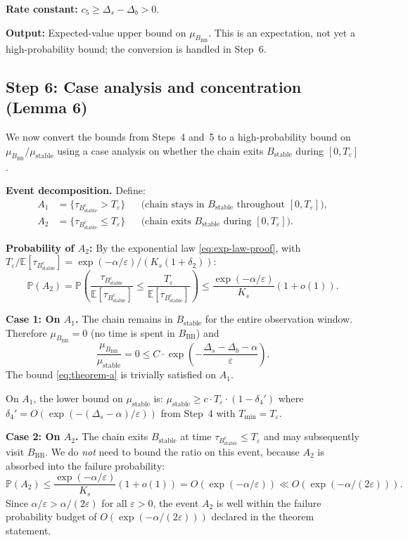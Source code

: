 \documentclass[11pt]{article}
\newcommand{\eps}{\varepsilon}
\newcommand{\Ds}{\Delta_s}
\newcommand{\Db}{\Delta_b}
\newcommand{\Bstable}{B_{\mathrm{stable}}}
\newcommand{\BBB}{B_{\mathrm{BB}}}
\newcommand{\Teps}{T_\eps}
\begin{document}
\textbf{Rate constant:} $c_5 \geq \Ds - \Db > 0$.

\textbf{Output:} Expected-value upper bound on $\mu_\BBB$.
This is an expectation, not yet a high-probability bound;
the conversion is handled in Step~6.

\subsection*{Step 6: Case analysis and concentration (Lemma 6)}
\label{step:case-analysis}

We now convert the bounds from Steps~4 and~5 to a high-probability
bound on $\mu_\BBB / \mu_{\mathrm{stable}}$ using a case analysis
on whether the chain exits $\Bstable$ during $[0, \Teps]$.

\medskip
\textbf{Event decomposition.} Define:
\begin{align*}
  A_1 &= \{\tau_{\Bstable^c} > \Teps\}
    && \text{(chain stays in $\Bstable$ throughout $[0, \Teps]$)}, \\
  A_2 &= \{\tau_{\Bstable^c} \leq \Teps\}
    && \text{(chain exits $\Bstable$ during $[0, \Teps]$)}.
\end{align*}

\textbf{Probability of $A_2$:}
By the exponential law \eqref{eq:exp-law-proof}, with
$\Teps / \mathbb{E}[\tau_{\Bstable^c}]
= \exp(-\alpha/\eps) / (K_s(1+\delta_2))$:
\begin{equation}\label{eq:P-A2}
  \mathbb{P}(A_2)
  = \mathbb{P}\!\left(
    \frac{\tau_{\Bstable^c}}{\mathbb{E}[\tau_{\Bstable^c}]}
    \leq \frac{\Teps}{\mathbb{E}[\tau_{\Bstable^c}]}
  \right)
  \leq \frac{\exp(-\alpha/\eps)}{K_s}(1 + o(1)).
\end{equation}

\textbf{Case 1: On $A_1$.}
The chain remains in $\Bstable$ for the entire observation window.
Therefore $\mu_\BBB = 0$ (no time is spent in $\BBB$) and
\[
  \frac{\mu_\BBB}{\mu_{\mathrm{stable}}} = 0
  \leq C \cdot \exp\!\left(-\frac{\Ds - \Db - \alpha}{\eps}\right).
\]
The bound \eqref{eq:theorem-a} is trivially satisfied on $A_1$.

On $A_1$, the lower bound on $\mu_{\mathrm{stable}}$ is:
$\mu_{\mathrm{stable}} \geq c \cdot \Teps \cdot (1 - \delta_4')$
where $\delta_4' = O(\exp(-(\Ds - \alpha)/\eps))$
from Step~4 with $T_{\min} = \Teps$.

\textbf{Case 2: On $A_2$.}
The chain exits $\Bstable$ at time $\tau_{\Bstable^c} \leq \Teps$
and may subsequently visit $\BBB$. We do \emph{not} need to bound
the ratio on this event, because $A_2$ is absorbed into the
failure probability:
\begin{equation}\label{eq:failure-budget}
  \mathbb{P}(A_2)
  \leq \frac{\exp(-\alpha/\eps)}{K_s}(1 + o(1))
  = O(\exp(-\alpha/\eps))
  \ll O(\exp(-\alpha/(2\eps))).
\end{equation}
Since $\alpha/\eps > \alpha/(2\eps)$ for all $\eps > 0$,
the event $A_2$ is well within the failure probability budget
of $O(\exp(-\alpha/(2\eps)))$ declared in the theorem statement.
\end{document}
